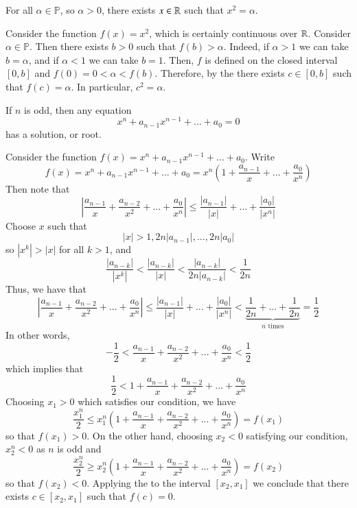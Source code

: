 \documentclass[12pt]{report}
\begin{document}
\begin{cor}{}{}
    For all $\alpha \in \mathbb{P}$, so $\alpha >0$, there exists $x \in \mathbb R$ such that $x^2 = \alpha$.
\end{cor}
\begin{proof*}{}{}
    Consider the function $f(x) = x^2$, which is certainly continuous over $\mathbb R$. Consider $\alpha \in \mathbb{P}$. Then there exists $b > 0$ such that $f(b) > \alpha$. Indeed, if $\alpha > 1$ we can take $b = \alpha$, and if $\alpha < 1$ we can take $b = 1$. Then, $f$ is defined on the closed interval $[0,b]$ and $f(0) = 0 < \alpha < f(b)$. Therefore, by the  there exists $c \in [0,b]$ such that $f(c) = \alpha$. In particular, $c^2 = \alpha$.
\end{proof*}



\begin{cor}{}{}
    If $n$ is odd, then any equation \begin{equation}
        x^n + a_{n-1}x^{n-1} + ... + a_0 = 0
    \end{equation}
    has a solution, or root.
\end{cor}
\begin{proof*}{}{}
    Consider the function $f(x) = x^n+a_{n-1}x^{n-1} + ... + a_0$. Write $$f(x) = x^n+a_{n-1}x^{n-1} + ... + a_0 = x^n\left(1 + \frac{a_{n-1}}{x} + ... + \frac{a_0}{x^n}\right)$$ 
    Then note that $$\left|\frac{a_{n-1}}{x} + \frac{a_{n-2}}{x^2} + ... + \frac{a_0}{x^n}\right|\leq \frac{|a_{n-1}|}{|x|} + ... + \frac{|a_0|}{|x^n|}$$
    Choose $x$ such that $$|x| > 1,2n|a_{n-1}|,...,2n|a_0|$$
    so $|x^k| > |x|$ for all $k > 1$, and $$\frac{|a_{n-k}|}{|x^k|} < \frac{|a_{n-k}|}{|x|} < \frac{|a_{n-k}|}{2n|a_{n-k}|} < \frac{1}{2n}$$
    Thus, we have that $$\left|\frac{a_{n-1}}{x} + \frac{a_{n-2}}{x^2} + ... + \frac{a_0}{x^n}\right|\leq \frac{|a_{n-1}|}{|x|} + ... + \frac{|a_0|}{|x^n|} < \underbrace{\frac{1}{2n} + ... +\frac{1}{2n}}_{\text{$n$ times}} = \frac{1}{2}$$
    In other words, $$-\frac{1}{2} < \frac{a_{n-1}}{x} + \frac{a_{n-2}}{x^2} + ... + \frac{a_0}{x^n} < \frac{1}{2}$$
    which implies that $$\frac{1}{2} < 1 + \frac{a_{n-1}}{x} + \frac{a_{n-2}}{x^2} + ... + \frac{a_0}{x^n}$$
    Choosing $x_1 > 0$ which satisfies our condition, we have $$\frac{x_1^n}{2} \leq x_1^n\left(1+\frac{a_{n-1}}{x} + \frac{a_{n-2}}{x^2} + ... + \frac{a_0}{x^n}\right) = f(x_1)$$
    so that $f(x_1) > 0$. On the other hand, choosing $x_2 < 0$ satisfying our condition, $x_2^n < 0$ as $n$ is odd and $$\frac{x_2^n}{2} \geq x_2^n\left(1+\frac{a_{n-1}}{x} + \frac{a_{n-2}}{x^2} + ... + \frac{a_0}{x^n}\right) = f(x_2)$$
    so that $f(x_2) < 0$. Applying the  to the interval $[x_2,x_1]$ we conclude that there exists $c \in [x_2,x_1]$ such that $f(c) = 0$.
\end{proof*}
\end{document}
